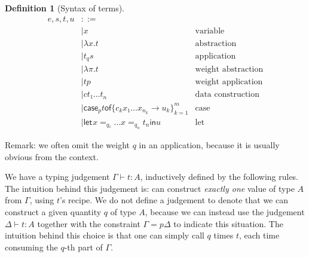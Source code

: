 \documentclass[11pt]{article}
\newcommand{\case}[3][]{\mathsf{case}_{#1} #2 \mathsf{of} \{#3\}^m_{k=1}}
\newcommand{\flet}[1][]{\mathsf{let}_{#1} }
\newcommand{\fin}{ \mathsf{in} }
\newtheorem{definition}{Definition}
\begin{document}
\begin{definition}[Syntax of terms]
\begin{align*}
e,s,t,u & ::= \\
    & |  x & \text{variable} \\
    & |  λx. t & \text{abstraction} \\
    & |  t_q s & \text{application} \\
    & |  λπ. t & \text{weight abstraction} \\
    & |  t p & \text{weight application} \\
    & |  c t₁ … t_n & \text{data construction} \\
    & |  \case[p] t {c_k  x₁ … x_{n_k} → u_k}  & \text{case} \\
    & |  \flet x =_{q₁} … x =_{q_n} t_n \fin u & \text{let}
\end{align*}
\end{definition}


Remark: we often omit the weight $q$ in an application, because it is
usually obvious from the context.

We have a typing judgement \(Γ ⊢ t : A\), inductively defined by the
following rules.  The intuition behind this judgement is: can
construct \emph{exactly one} value of type $A$ from $Γ$, using $t$'s
recipe. We do not define a judgement to denote that we can construct a
given quantity $q$ of type $A$, because we can instead use the
judgement $Δ ⊢ t : A$ together with the constraint $Γ = pΔ$ to
indicate this situation. The intuition behind this choice is that one
can simply call $q$ times $t$, each time consuming the $q$-th part of
$Γ$.
\end{document}
